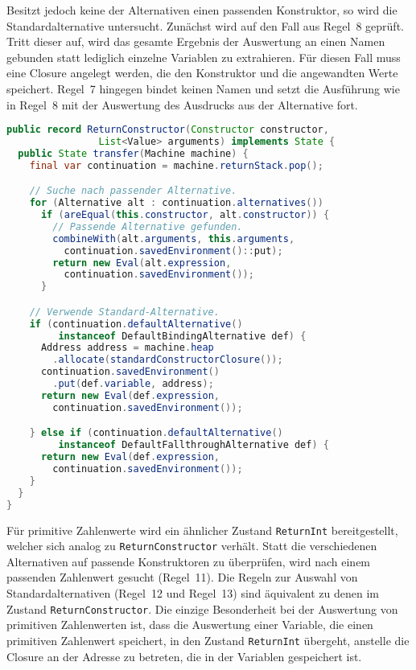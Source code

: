 Besitzt jedoch keine der Alternativen einen passenden Konstruktor, so wird die Standardalternative untersucht.
Zunächst wird auf den Fall aus Regel~8 geprüft.
Tritt dieser auf, wird das gesamte Ergebnis der Auswertung an einen Namen gebunden statt lediglich einzelne Variablen zu extrahieren.
Für diesen Fall muss eine Closure angelegt werden, die den Konstruktor und die angewandten Werte speichert.
Regel~7 hingegen bindet keinen Namen und setzt die Ausführung wie in Regel~8 mit der Auswertung des Ausdrucks aus der Alternative fort.

\begin{lstlisting}[language=java, morekeywords={record, var}, caption={Implementierung der Auswahl einer Alternative}]
public record ReturnConstructor(Constructor constructor,
                List<Value> arguments) implements State {
  public State transfer(Machine machine) {
    final var continuation = machine.returnStack.pop();

    // Suche nach passender Alternative.
    for (Alternative alt : continuation.alternatives())
      if (areEqual(this.constructor, alt.constructor)) {
        // Passende Alternative gefunden.
        combineWith(alt.arguments, this.arguments,
          continuation.savedEnvironment()::put);
        return new Eval(alt.expression,
          continuation.savedEnvironment());
      }

    // Verwende Standard-Alternative.
    if (continuation.defaultAlternative()
         instanceof DefaultBindingAlternative def) {
      Address address = machine.heap
        .allocate(standardConstructorClosure());
      continuation.savedEnvironment()
        .put(def.variable, address);
      return new Eval(def.expression,
        continuation.savedEnvironment());

    } else if (continuation.defaultAlternative()
         instanceof DefaultFallthroughAlternative def) {
      return new Eval(def.expression,
        continuation.savedEnvironment());
    }
  }
}
\end{lstlisting}


Für primitive Zahlenwerte wird ein ähnlicher Zustand \texttt{ReturnInt} bereitgestellt, welcher sich analog zu \texttt{ReturnConstructor} verhält.
Statt die verschiedenen Alternativen auf passende Konstruktoren zu überprüfen, wird nach einem passenden Zahlenwert gesucht (Regel~11).
Die Regeln zur Auswahl von Standardalternativen (Regel~12 und Regel~13) sind äquivalent zu denen im Zustand \texttt{ReturnConstructor}.
Die einzige Besonderheit bei der Auswertung von primitiven Zahlenwerten ist, dass die Auswertung einer Variable, die einen primitiven Zahlenwert speichert, in den Zustand \texttt{ReturnInt} übergeht, anstelle die Closure an der Adresse zu betreten, die in der Variablen gespeichert ist.

